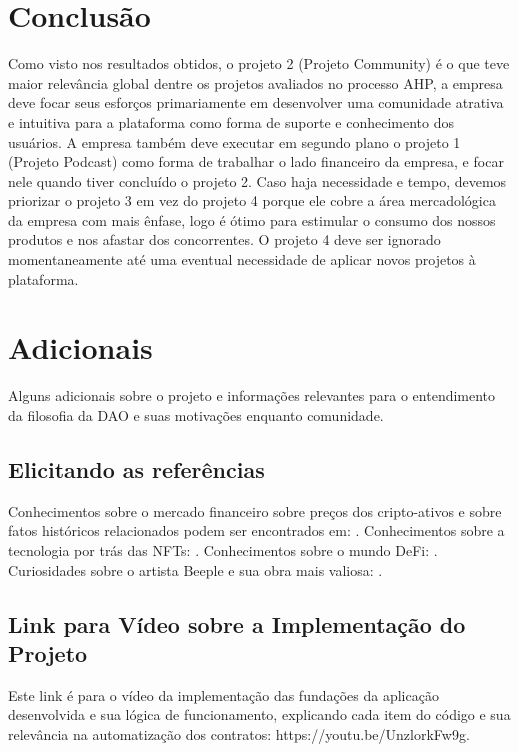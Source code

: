 \documentclass[onecolumn,12pt]{asme2ej}
\begin{document}
\section{Conclusão}

Como visto nos resultados obtidos, o projeto 2 (Projeto Community) é o que teve maior relevância global dentre os projetos avaliados no processo AHP, a empresa deve focar seus esforços primariamente em desenvolver uma comunidade atrativa e intuitiva para a plataforma como forma de suporte e conhecimento dos usuários. A empresa também deve executar em segundo plano o projeto 1 (Projeto Podcast) como forma de trabalhar o lado financeiro da empresa, e focar nele quando tiver concluído o projeto 2. Caso haja necessidade e tempo, devemos priorizar o projeto 3 em vez do projeto 4 porque ele cobre a área mercadológica da empresa com mais ênfase, logo é ótimo para estimular o consumo dos nossos produtos e nos afastar dos concorrentes. O projeto 4 deve ser ignorado momentaneamente até uma eventual necessidade de aplicar novos projetos à plataforma.

\section{Adicionais}

Alguns adicionais sobre o projeto e informações relevantes para o entendimento da filosofia da DAO e suas motivações enquanto comunidade.

\subsection{Elicitando as referências}

Conhecimentos sobre o mercado financeiro sobre preços dos cripto-ativos e sobre fatos históricos relacionados podem ser encontrados em: \cite{rrf1}\cite{rrf12}\cite{rrf8}\cite{rrf11}\cite{rrf4}. Conhecimentos sobre a tecnologia por trás das NFTs: \cite{rrf5}
\cite{rrf9}\cite{rrf7}. Conhecimentos sobre o mundo DeFi: \cite{rrf3}\cite{rrf6}. Curiosidades sobre o artista Beeple e sua obra mais valiosa: \cite{rrf2}.

\subsection{Link para Vídeo sobre a Implementação do Projeto}

Este link é para o vídeo da implementação das fundações da aplicação desenvolvida e sua lógica de funcionamento, explicando cada item do código e sua relevância na automatização dos contratos: https://youtu.be/UnzlorkFw9g.

\newpage
\printbibliography  
\end{document}
